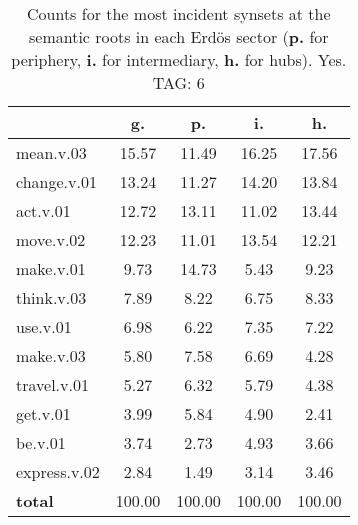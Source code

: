 \begin{table}[h!]
\begin{center}
\begin{tabular}{| l || c | c | c | c |}\hline
 & {\bf g.} & {\bf p.} & {\bf i.} & {\bf h.} \\\hline\hline
mean.v.03 & 15.57  & 11.49  & 16.25  & 17.56 \\\hline
change.v.01 & 13.24  & 11.27  & 14.20  & 13.84 \\\hline
act.v.01 & 12.72  & 13.11  & 11.02  & 13.44 \\\hline
move.v.02 & 12.23  & 11.01  & 13.54  & 12.21 \\\hline
make.v.01 & 9.73  & 14.73  & 5.43  & 9.23 \\\hline
think.v.03 & 7.89  & 8.22  & 6.75  & 8.33 \\\hline
use.v.01 & 6.98  & 6.22  & 7.35  & 7.22 \\\hline
make.v.03 & 5.80  & 7.58  & 6.69  & 4.28 \\\hline
travel.v.01 & 5.27  & 6.32  & 5.79  & 4.38 \\\hline
get.v.01 & 3.99  & 5.84  & 4.90  & 2.41 \\\hline
be.v.01 & 3.74  & 2.73  & 4.93  & 3.66 \\\hline
express.v.02 & 2.84  & 1.49  & 3.14  & 3.46 \\\hline\hline
{{\bf total}} & 100.00  & 100.00  & 100.00  & 100.00 \\\hline
\end{tabular}
\caption{Counts for the most incident synsets at the semantic roots in each Erd\"os sector ({\bf p.} for periphery, {\bf i.} for intermediary, {\bf h.} for hubs). Yes. TAG: 6}
\end{center}
\end{table}